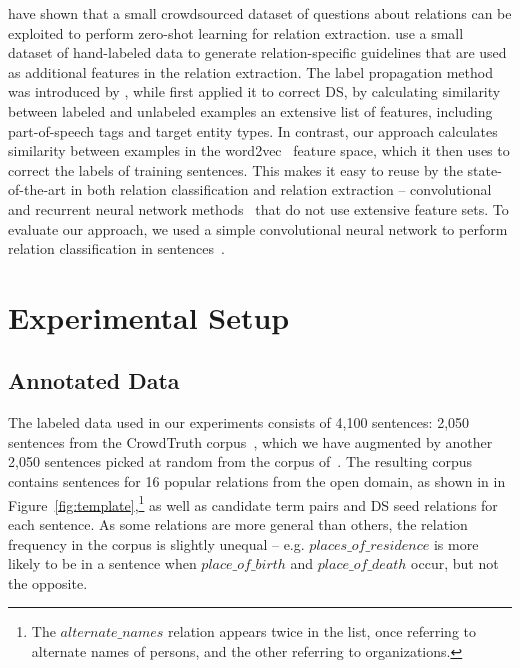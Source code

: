 \citet{levy2017zero} have shown that a small crowdsourced dataset of questions about relations can be exploited to perform zero-shot learning for relation extraction. \citet{pershina2014infusion} use a small dataset of hand-labeled data to generate relation-specific guidelines that are used as additional features in the relation extraction. The label propagation method was introduced by \citet{xiaojin2002learning}, while \citet{Chen:2006:REU:1220175.1220192} first applied it to correct DS, by calculating similarity between labeled and unlabeled examples an extensive list of features, including part-of-speech tags and target entity types. In contrast, our approach calculates similarity between examples in the word2vec~\cite{mikolov2013distributed} feature space, which it then uses to correct the labels of training sentences. This makes it easy to reuse by the state-of-the-art in both relation classification and relation extraction -- convolutional~\cite{ji2017distant} and recurrent neural network methods~\cite{zhou2016attention} that do not use extensive feature sets. To evaluate our approach, we used a simple convolutional neural network to perform relation classification in sentences~\cite{nguyen2015relation}. 


\section{Experimental Setup}

\subsection{Annotated Data}

The labeled data used in our experiments consists of 4,100 sentences: 2,050 sentences from the CrowdTruth corpus~\cite{dumitrache2017false}, which we have augmented by another 2,050 sentences picked at random from the corpus of~\citet{angeli2014combining}. The resulting corpus contains sentences for 16 popular relations from the open domain, as shown in in Figure~\ref{fig:template},\footnote{The $alternate\_names$ relation appears twice in the list, once referring to alternate names of persons, and the other referring to organizations.} as well as candidate term pairs and DS seed relations for each sentence. As some relations are more general than others, the relation frequency in the corpus is slightly unequal -- e.g. $places\_of\_residence$ is more likely to be in a sentence when $place\_of\_birth$ and $place\_of\_death$ occur, but not the opposite.

